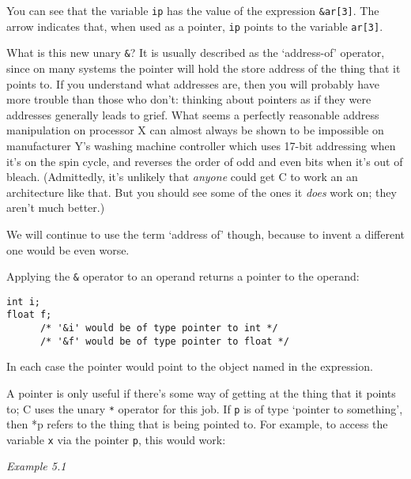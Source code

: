    You can see that the variable \texttt{ip} has the value of the
    expression \texttt{\&ar[3]}. The arrow indicates that, when used
    as a pointer, \texttt{ip} points to the variable
    \texttt{ar[3]}.


   What is this new unary \texttt{\&}? It is usually described as
    the `address-of' operator, since on many systems the pointer will
    hold the store address of the thing that it points to. If you understand
    what addresses are, then you will probably have more trouble than those
    who don't: thinking about pointers as if they were addresses generally
    leads to grief. What seems a perfectly reasonable address manipulation
    on processor X can almost always be shown to be impossible on
    manufacturer Y's washing machine controller which uses 17-bit addressing
    when it's on the spin cycle, and reverses the order of odd and even bits
    when it's out of bleach. (Admittedly, it's unlikely that \textit{anyone}
    could get C to work an an architecture like that. But you should see
    some of the ones it \textit{does} work on; they aren't much better.)


   We will continue to use the term `address of' though, because to
    invent a different one would be even worse.


   Applying the \texttt{\&} operator to an operand returns
    a pointer to the operand:


   \begin{Verbatim}
int i;
float f;
      /* '&i' would be of type pointer to int */
      /* '&f' would be of type pointer to float */
\end{Verbatim}

   In each case the pointer would point to the object named in the
    expression.


   A pointer is only useful if there's some way of getting at the thing
    that it points to; C uses the unary \texttt{*} operator for this
    job.  If \texttt{p} is of type `pointer to something', then *p
    refers to the thing that is being pointed to. For example, to access the
    variable \texttt{x} via the pointer \texttt{p}, this would
    work:


    \begin{center}\textit{Example 5.1}\end{center}



